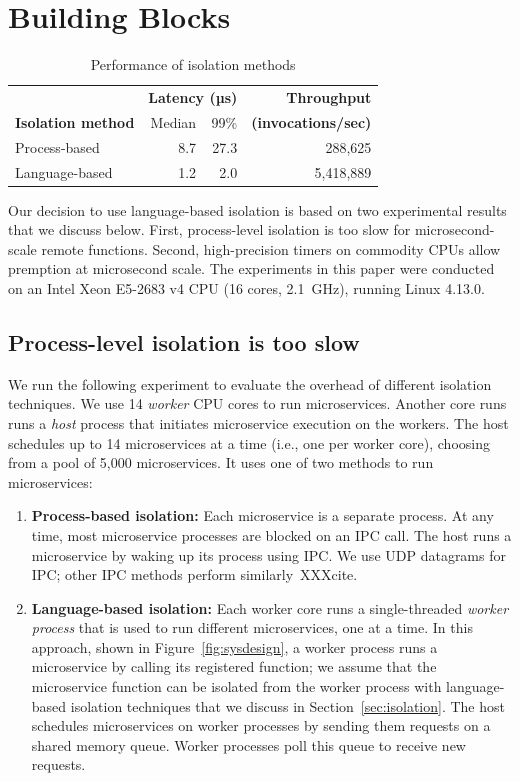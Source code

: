 \section{Building Blocks}
\label{sec:motive}

\begin{table}
\begin{center}
\small
\begin{tabular}{lrrr}
   & \multicolumn{2}{c}{\textbf{Latency (µs)}} & \textbf{Throughput} \\
  \textbf{Isolation method} & Median & 99\% & \textbf{(invocations/sec)} \\
\midrule
Process-based & 8.7 & 27.3 & 288,625 \\
Language-based & 1.2 & 2.0 & 5,418,889 \\
\end{tabular}
\caption{Performance of isolation methods}
\label{tab:isolation_methods}
\end{center}
\end{table}

Our decision to use language-based isolation is based on two experimental
results that we discuss below. First, process-level isolation is too slow for
microsecond-scale remote functions. Second, high-precision timers on commodity
CPUs allow premption at microsecond scale. The experiments in this paper were
conducted on an Intel Xeon E5-2683 v4 CPU (16 cores, 2.1~GHz), running
Linux 4.13.0.

\subsection{Process-level isolation is too slow}
We run the following experiment to evaluate the overhead of different isolation
techniques. We use 14 \emph{worker} CPU cores to run microservices. Another core runs
runs a \emph{host} process that initiates microservice execution on the workers.
The host schedules up to 14 microservices at a time (i.e., one
per worker core), choosing from a pool of 5,000 microservices. It uses one of two
methods to run microservices:

\begin{enumerate}
\item \textbf{Process-based isolation:} Each microservice is a separate process.
At any time, most microservice processes are blocked on an IPC
call. The host runs a microservice by waking up its process using IPC. We use
UDP datagrams for IPC; other IPC methods perform similarly~XXXcite.
\item \textbf{Language-based isolation:} Each worker core runs a single-threaded
\emph{worker process} that is used to run different microservices, one at a time.
In this approach, shown in Figure~\ref{fig:sysdesign}, a worker process runs a
microservice by calling its registered
function; we assume that the microservice function can be isolated from the
worker process with language-based isolation techniques that we discuss in
Section~\ref{sec:isolation}. The host schedules microservices on worker processes by
sending them
requests on a shared memory queue. Worker processes poll this queue to receive
new requests.
\end{enumerate}

